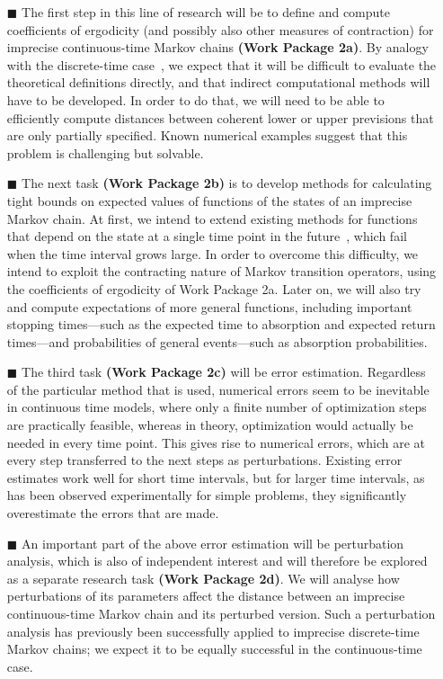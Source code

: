 \documentclass[11pt,dvipsnames,usenames,a4paper]{article}
\begin{document}
\vspace{6pt}
\begin{itemize}
\item[\tiny$\blacksquare$]
The first step in this line of research will be to define and compute coefficients of ergodicity (and possibly also other measures of contraction) for imprecise continuous-time Markov chains {\bf(Work Package 2a)}. By analogy with the discrete-time case~\cite{skulj2013}, we expect that it will be difficult to evaluate the theoretical definitions directly, and that indirect computational methods will have to be developed. In order to do that, we will need to be able to efficiently compute distances between coherent lower or upper previsions that are only partially specified. Known numerical examples suggest that this problem is challenging but solvable. %
\item[\tiny$\blacksquare$]  
The next task {\bf(Work Package 2b)} is to develop methods for calculating tight bounds on expected values of functions of the states of an imprecise Markov chain. At first, we intend to extend existing methods for functions that depend on the state at a single time point in the future~\cite{skulj2015:continuous:bounds}, which fail when the time interval grows large. In order to overcome this difficulty, we intend to exploit the contracting nature of Markov transition operators, using the coefficients of ergodicity of Work Package 2a. Later on, we will also try and compute expectations of more general functions, including important stopping times---such as the expected time to absorption and expected return times---and probabilities of general events---such as absorption probabilities.

\item[\tiny$\blacksquare$] 
The third task {\bf(Work Package 2c)} will be error estimation. 
Regardless of the particular method that is used, numerical errors seem to be inevitable in continuous time models, where only a finite number of optimization steps are practically feasible, whereas in theory, optimization would actually be needed in every time point. 
This gives rise to numerical errors, which are at every step transferred to the next steps as perturbations. 
Existing error estimates work well for short time intervals, but for larger time intervals, as has been observed experimentally for simple problems, they significantly overestimate the errors that are made.

\item[\tiny$\blacksquare$] 
An important part of the above error estimation will be perturbation analysis, which is also of independent interest and will therefore be explored as a separate research task {\bf(Work Package 2d)}. 
We will analyse how perturbations of its parameters affect the distance between an imprecise continuous-time Markov chain and its perturbed version.
Such a perturbation analysis has previously been successfully applied to imprecise discrete-time Markov chains; we expect it to be equally successful in the continuous-time case.\vspace{8pt}
\end{itemize}
\end{document}
